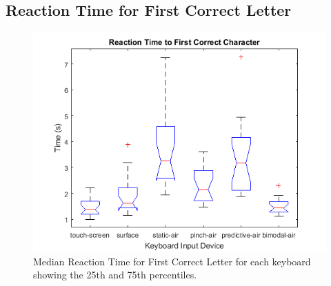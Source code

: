 \subsection{Reaction Time for First Correct Letter}
\begin{figure}[h]
	\centering
	\includegraphics{fig_reaction_pressed_boxplot}
	\caption[Reaction Time for First Correct Letter Boxplot]{Median Reaction Time for First Correct Letter for each keyboard showing the 25th and 75th percentiles.}
	\label{fig_reaction_pressed_boxplot}
\end{figure}

